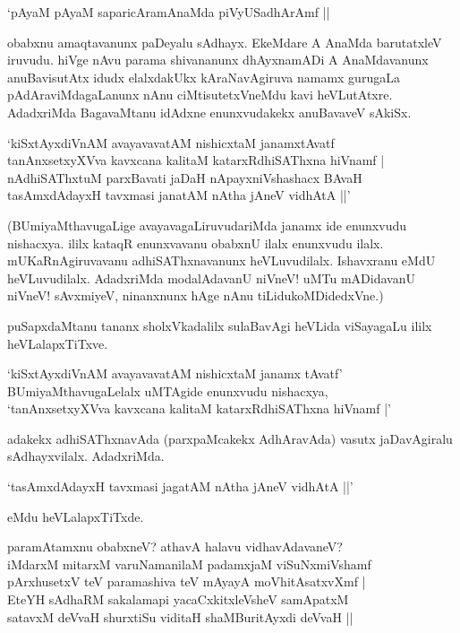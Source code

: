 \begin{shloka}
`pAyaM pAyaM saparicAramAnaMda piVyUSadhArAmf ||
\end{shloka}

obabxnu amaqtavanunx paDeyalu sAdhayx. EkeMdare A AnaMda barutatxleV iruvudu. hiVge nAvu parama shivananunx dhAyxnamADi A AnaMdavanunx anuBavisutAtx idudx elalxdakUkx kAraNavAgiruva namamx gurugaLa pAdAraviMdagaLanunx nAnu ciMtisutetxVneMdu kavi heVLutAtxre. AdadxriMda BagavaMtanu idAdxne enunxvudakekx anuBavaveV sAkiSx.

\begin{shloka}
`kiSxtAyxdiVnAM avayavavatAM nishicxtaM janamxtAvatf\\
tanAnxsetxyXVva kavxcana kalitaM katarxRdhiSAThxna hiVnamf |\\
nAdhiSAThxtuM parxBavati jaDaH nApayxniVshashacx BAvaH\\
tasAmxdAdayxH tavxmasi janatAM nAtha jAneV vidhAtA ||'
\end{shloka}

(BUmiyaMthavugaLige avayavagaLiruvudariMda janamx ide enunxvudu nishacxya. ililx kataqR enunxvavanu obabxnU ilalx enunxvudu ilalx. mUKaRnAgiruvavanu adhiSAThxnavanunx heVLuvudilalx. Ishavxranu eMdU heVLuvudilalx. AdadxriMda modalAdavanU niVneV! uMTu mADidavanU niVneV! sAvxmiyeV, ninanxnunx hAge nAnu tiLidukoMDidedxVne.)

puSapxdaMtanu tananx sholxVkadalilx sulaBavAgi heVLida viSayagaLu ililx heVLalapxTiTxve.

\begin{shloka}
`kiSxtAyxdiVnAM avayavavatAM nishicxtaM janamx tAvatf'\\
BUmiyaMthavugaLelalx uMTAgide enunxvudu nishacxya,\\
`tanAnxsetxyXVva kavxcana kalitaM katarxRdhiSAThxna hiVnamf |'
\end{shloka}

adakekx adhiSAThxnavAda (parxpaMcakekx AdhAravAda) vasutx jaDavAgiralu sAdhayxvilalx. AdadxriMda.

\begin{shloka}
`tasAmxdAdayxH tavxmasi jagatAM nAtha jAneV vidhAtA ||'
\end{shloka}

eMdu heVLalapxTiTxde.

\begin{shloka}
paramAtamxnu obabxneV? athavA halavu vidhavAdavaneV?\\[5pt]
iMdarxM mitarxM varuNamanilaM padamxjaM viSuNxmiVshamf\\
pArxhusetxV teV paramashiva teV mAyayA moVhitAsatxvXmf |\\[5pt]
EteYH sAdhaRM sakalamapi yacaCxkitxleVsheV samApatxM\\
satavxM deVvaH shurxtiSu viditaH shaMBuritAyxdi deVvaH ||
\end{shloka}

